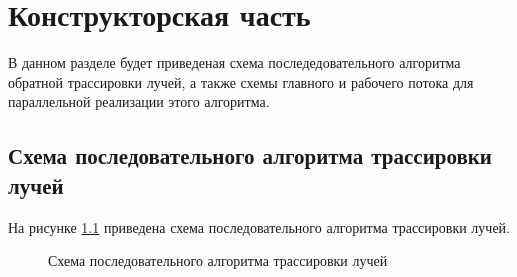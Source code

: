 \chapter{Конструкторская часть}

В данном разделе будет приведеная схема последедовательного алгоритма обратной трассировки лучей, а также схемы главного и рабочего потока для параллельной реализации этого алгоритма.

\section{Схема последовательного алгоритма трассировки лучей}

На рисунке \ref{fig:trass_simple} приведена схема последовательного алгоритма трассировки лучей.

\begin{figure}[h!]
	
	
	\caption{Схема последовательного алгоритма трассировки лучей}
	
	\label{fig:trass_simple}
	
\end{figure}

